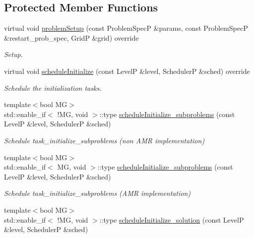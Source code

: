 \subsection*{Protected Member Functions}
\begin{DoxyCompactItemize}
\item 
virtual void \hyperlink{classUintah_1_1PhaseField_1_1Heat_a0df5d43c738640bcbbd7781ca45b6274}{problem\+Setup} (const Problem\+SpecP \&params, const Problem\+SpecP \&restart\+\_\+prob\+\_\+spec, GridP \&grid) override
\begin{DoxyCompactList}\small\item\em Setup. \end{DoxyCompactList}\item 
virtual void \hyperlink{classUintah_1_1PhaseField_1_1Heat_aa6b857a08f51311bba30771145176601}{schedule\+Initialize} (const LevelP \&level, SchedulerP \&sched) override
\begin{DoxyCompactList}\small\item\em Schedule the initialization tasks. \end{DoxyCompactList}\item 
{\footnotesize template$<$bool MG$>$ }\\std\+::enable\+\_\+if$<$ !MG, void $>$\+::type \hyperlink{classUintah_1_1PhaseField_1_1Heat_a0e727154c6a78ee48cec37740cfe2889}{schedule\+Initialize\+\_\+subproblems} (const LevelP \&level, SchedulerP \&sched)
\begin{DoxyCompactList}\small\item\em Schedule task\+\_\+initialize\+\_\+subproblems (non A\+MR implementation) \end{DoxyCompactList}\item 
{\footnotesize template$<$bool MG$>$ }\\std\+::enable\+\_\+if$<$ MG, void $>$\+::type \hyperlink{classUintah_1_1PhaseField_1_1Heat_a0e727154c6a78ee48cec37740cfe2889}{schedule\+Initialize\+\_\+subproblems} (const LevelP \&level, SchedulerP \&sched)
\begin{DoxyCompactList}\small\item\em Schedule task\+\_\+initialize\+\_\+subproblems (A\+MR implementation) \end{DoxyCompactList}\item 
{\footnotesize template$<$bool MG$>$ }\\std\+::enable\+\_\+if$<$ !MG, void $>$\+::type \hyperlink{classUintah_1_1PhaseField_1_1Heat_a0ee0e3cbb32c28fd0cb4b567cb0dbd9b}{schedule\+Initialize\+\_\+solution} (const LevelP \&level, SchedulerP \&sched)

\end{DoxyCompactItemize}
